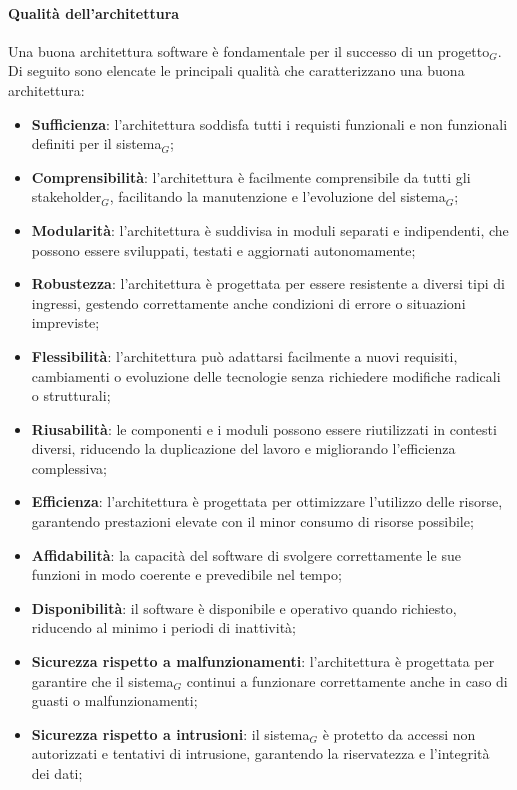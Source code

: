 \documentclass[10pt]{article}
\begin{document}
\begin{justify}
        \paragraph{Qualità dell'architettura}
        Una buona architettura software è fondamentale per il successo di un progetto$_G$. Di seguito sono elencate le principali qualità che caratterizzano una buona architettura:
        \begin{itemize}
            \item \textbf{Sufficienza}: l'architettura soddisfa tutti i requisti funzionali e non funzionali definiti per il sistema$_G$;
            \item \textbf{Comprensibilità}: l'architettura è facilmente comprensibile da tutti gli stakeholder$_G$, facilitando la manutenzione e l'evoluzione del sistema$_G$;
            \item \textbf{Modularità}: l'architettura è suddivisa in moduli separati e indipendenti, che possono essere sviluppati, testati e aggiornati autonomamente;
            \item \textbf{Robustezza}: l'architettura è progettata per essere resistente a diversi tipi di ingressi, gestendo correttamente anche condizioni di errore o situazioni impreviste;
            \item \textbf{Flessibilità}: l'architettura può adattarsi facilmente a nuovi requisiti, cambiamenti o evoluzione delle tecnologie senza richiedere modifiche radicali o strutturali;
            \item \textbf{Riusabilità}: le componenti e i moduli possono essere riutilizzati in contesti diversi, riducendo la duplicazione del lavoro e migliorando l'efficienza complessiva;
            \item \textbf{Efficienza}: l'architettura è progettata per ottimizzare l'utilizzo delle risorse, garantendo prestazioni elevate con il minor consumo di risorse possibile;
            \item \textbf{Affidabilità}: la capacità del software di svolgere correttamente le sue funzioni in modo coerente e prevedibile nel tempo;
            \item \textbf{Disponibilità}: il software è disponibile e operativo quando richiesto, riducendo al minimo i periodi di inattività;
            \item \textbf{Sicurezza rispetto a malfunzionamenti}: l'architettura è progettata per garantire che il sistema$_G$ continui a funzionare correttamente anche in caso di guasti o malfunzionamenti;
            \item \textbf{Sicurezza rispetto a intrusioni}: il sistema$_G$ è protetto da accessi non autorizzati e tentativi di intrusione, garantendo la riservatezza e l'integrità dei dati;

\end{itemize}
\end{justify}
\end{document}
